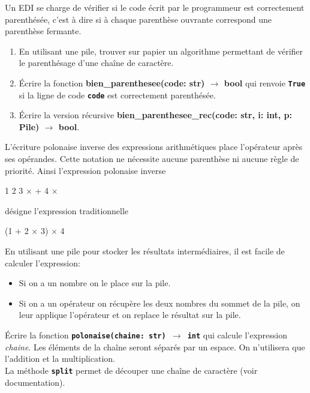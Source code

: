 \documentclass[a4paper,11pt]{article}
\begin{document}
\begin{exo}
    Un EDI se charge de vérifier si le code écrit par le programmeur est correctement parenthésée, c'est à dire si à chaque parenthèse ouvrante correspond une parenthèse fermante.
    \begin{enumerate}
        \item En utilisant une pile, trouver sur papier un algorithme permettant de vérifier le parenthésage d'une chaîne de caractère.
        \item Écrire la fonction \textbf{bien\_parenthesee(code: str) $\rightarrow$ bool} qui renvoie \texttt{\textbf{True}} si la ligne de code \textbf{\texttt{code}} est correctement parenthésée.
        \item Écrire la version récursive \textbf{bien\_parenthesee\_rec(code: str, i: int, p: Pile) $\rightarrow$ bool}.
    \end{enumerate}
\end{exo}
\begin{exo}
    L'écriture polonaise inverse des expressions arithmétiques place l'opérateur après ses opérandes. Cette notation ne nécessite aucune parenthèse ni aucune règle de priorité. Ainsi l'expression polonaise inverse
    \begin{center}
        1 2 3 × + 4 ×
    \end{center}
    désigne l'expression traditionnelle
    \begin{center}
        (1 + 2 × 3) × 4
    \end{center}
    En utilisant une pile pour stocker les résultats intermédiaires, il est facile de calculer l'expression:
    \begin{itemize}
        \item Si on a un nombre on le place sur la pile.
        \item Si on a un opérateur on récupère les deux nombres du sommet de la pile, on leur applique l'opérateur et on replace le résultat sur la pile.
    \end{itemize}
    Écrire la fonction \texttt{\textbf{polonaise(chaine: str) $\rightarrow$ int}} qui calcule l'expression \emph{chaine}. Les éléments de la chaîne seront séparés par un espace. On n'utilisera que l'addition et la multiplication.\\La méthode \textbf{\texttt{split}} permet de découper une chaîne de caractère (voir documentation).
\end{exo}
\end{document}
